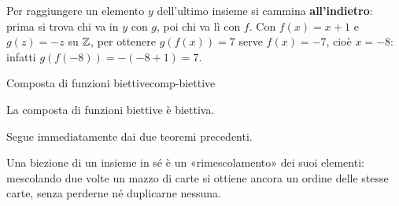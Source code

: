 \begin{spiegazione}
    Per raggiungere un elemento $y$ dell'ultimo insieme si cammina \textbf{all'indietro}: prima si trova chi va in $y$ con $g$, poi chi va lì con $f$. Con
    $f(x) = x + 1$ e $g(z) = -z$ su $\mathbb{Z}$, per ottenere $g(f(x)) = 7$ serve $f(x) = -7$, cioè $x = -8$: infatti $g(f(-8)) = -(-8 + 1) = 7$.
\end{spiegazione}


\begin{concetto}
\begin{Corollario}{Composta di funzioni biettive}{comp-biettive}
    \begin{prerequisiti}
    \end{prerequisiti}
    La composta di funzioni biettive è biettiva.
\end{Corollario}
\begin{dimostrazione}
    Segue immediatamente dai due teoremi precedenti.
\end{dimostrazione}
\end{concetto}

\begin{spiegazione}
    Una biezione di un insieme in sé è un «rimescolamento» dei suoi elementi: mescolando due volte un mazzo di carte si ottiene ancora un ordine delle
    stesse carte, senza perderne né duplicarne nessuna.
\end{spiegazione}


